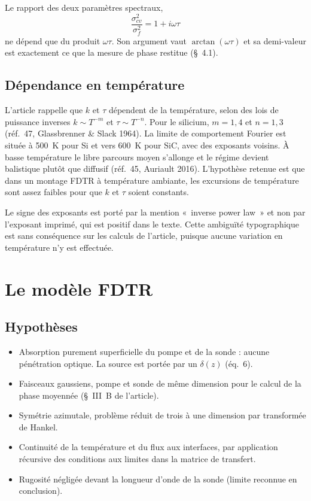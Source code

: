 \documentclass[11pt,a4paper]{article}
\begin{document}
Le rapport des deux paramètres spectraux,
\[
\frac{\sigma_{cv}^2}{\sigma_f^2} = 1 + i\omega\tau
\]
ne dépend que du produit $\omega\tau$. Son argument vaut $\arctan(\omega\tau)$ et sa demi-valeur
est exactement ce que la mesure de phase restitue (§~4.1).

\subsection{Dépendance en température}

L'article rappelle que $k$ et $\tau$ dépendent de la température, selon des lois de puissance
inverses $k \sim T^{-m}$ et $\tau \sim T^{-n}$. Pour le silicium, $m = 1{,}4$ et $n = 1{,}3$
(réf.~47, Glassbrenner \& Slack 1964). La limite de comportement Fourier est située à 500~K pour
Si et vers 600~K pour SiC, avec des exposants voisins. À basse température le libre parcours
moyen s'allonge et le régime devient balistique plutôt que diffusif (réf.~45, Auriault 2016).
L'hypothèse retenue est que dans un montage FDTR à température ambiante, les excursions de
température sont assez faibles pour que $k$ et $\tau$ soient constants.

Le signe des exposants est porté par la mention «~inverse power law~» et non par l'exposant
imprimé, qui est positif dans le texte. Cette ambiguïté typographique est sans conséquence sur
les calculs de l'article, puisque aucune variation en température n'y est effectuée.

\section{Le modèle FDTR}

\subsection{Hypothèses}

\begin{itemize}[leftmargin=1.2em,itemsep=2pt,topsep=2pt]
\item Absorption purement superficielle du pompe et de la sonde : aucune pénétration optique.
      La source est portée par un $\delta(z)$ (éq.~6).
\item Faisceaux gaussiens, pompe et sonde de même dimension pour le calcul de la phase moyennée
      (§~III~B de l'article).
\item Symétrie azimutale, problème réduit de trois à une dimension par transformée de Hankel.
\item Continuité de la température et du flux aux interfaces, par application récursive des
      conditions aux limites dans la matrice de transfert.
\item Rugosité négligée devant la longueur d'onde de la sonde (limite reconnue en conclusion).
\end{itemize}
\end{document}
